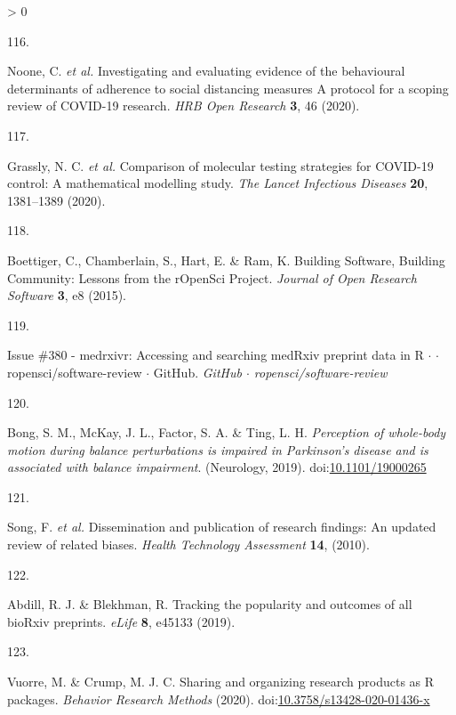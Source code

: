 \documentclass[a4paper, twoside]{templates/ociamthesis}
\newlength{\cslhangindent}
\newlength{\csllabelwidth}
\newenvironment{CSLReferences}[3] %
 {%
  \setlength{\parindent}{0pt}
  \ifodd #1 \everypar{\setlength{\hangindent}{\cslhangindent}}\ignorespaces\fi
  \ifnum #2 > 0
  \setlength{\parskip}{#2\baselineskip}
  \fi
 }%
 {}
\newcommand{\CSLLeftMargin}[1]{\parbox[t]{\maxof{\widthof{#1}}{\csllabelwidth}}{#1}}
\newcommand{\CSLRightInline}[1]{\parbox[t]{\linewidth - \csllabelwidth}{#1}}
\begin{document}
\begin{CSLReferences}{0}{0}
\leavevmode\hypertarget{ref-noone2020}{}%
\CSLLeftMargin{116. }
\CSLRightInline{Noone, C. \emph{et al.} Investigating and evaluating evidence of the behavioural determinants of adherence to social distancing measures {} {A} protocol for a scoping review of {COVID}-19 research. \emph{HRB Open Research} \textbf{3}, 46 (2020).}

\leavevmode\hypertarget{ref-grassly2020}{}%
\CSLLeftMargin{117. }
\CSLRightInline{Grassly, N. C. \emph{et al.} Comparison of molecular testing strategies for {COVID}-19 control: A mathematical modelling study. \emph{The Lancet Infectious Diseases} \textbf{20}, 1381--1389 (2020).}

\leavevmode\hypertarget{ref-boettiger2015}{}%
\CSLLeftMargin{118. }
\CSLRightInline{Boettiger, C., Chamberlain, S., Hart, E. \& Ram, K. Building {Software}, {Building Community}: {Lessons} from the {rOpenSci Project}. \emph{Journal of Open Research Software} \textbf{3}, e8 (2015).}

\leavevmode\hypertarget{ref-zotero-15016}{}%
\CSLLeftMargin{119. }
\CSLRightInline{Issue \#380 - medrxivr: {Accessing} and searching {medRxiv} preprint data in {R} {\(\cdot\)} {\(\cdot\)} ropensci/software-review {\(\cdot\)} {GitHub}. \emph{GitHub {\(\cdot\)} ropensci/software-review}}

\leavevmode\hypertarget{ref-bong2019}{}%
\CSLLeftMargin{120. }
\CSLRightInline{Bong, S. M., McKay, J. L., Factor, S. A. \& Ting, L. H. \emph{Perception of whole-body motion during balance perturbations is impaired in {Parkinson}'s disease and is associated with balance impairment}. ({Neurology}, 2019). doi:\href{https://doi.org/10.1101/19000265}{10.1101/19000265}}

\leavevmode\hypertarget{ref-song2010}{}%
\CSLLeftMargin{121. }
\CSLRightInline{Song, F. \emph{et al.} Dissemination and publication of research findings: An updated review of related biases. \emph{Health Technology Assessment} \textbf{14}, (2010).}

\leavevmode\hypertarget{ref-abdill2019b}{}%
\CSLLeftMargin{122. }
\CSLRightInline{Abdill, R. J. \& Blekhman, R. Tracking the popularity and outcomes of all {bioRxiv} preprints. \emph{eLife} \textbf{8}, e45133 (2019).}

\leavevmode\hypertarget{ref-vuorre2020}{}%
\CSLLeftMargin{123. }
\CSLRightInline{Vuorre, M. \& Crump, M. J. C. Sharing and organizing research products as {R} packages. \emph{Behavior Research Methods} (2020). doi:\href{https://doi.org/10.3758/s13428-020-01436-x}{10.3758/s13428-020-01436-x}}


\end{CSLReferences}
\end{document}
